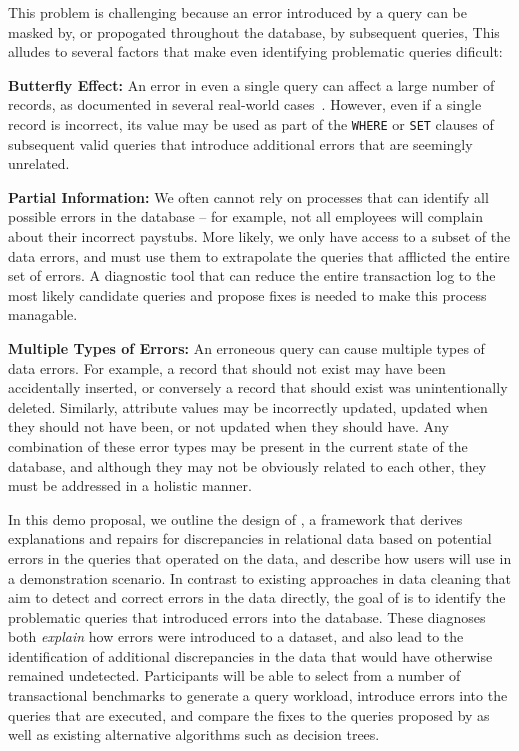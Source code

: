 This problem is challenging because an error introduced by a query can be masked by, or propogated throughout the database,
by subsequent queries, This alludes to several factors that make even identifying problematic queries dificult:

\begin{description}[leftmargin=*, topsep=0mm, itemsep=0mm]

  \item {\bf Butterfly Effect: } 
  An error in even a single query can affect a large number of records, as documented in several real-world
  cases~\cite{Yates10, Grady13, sakalerrors}.  However, even if a single record is incorrect,
  its value may be used as part of the \texttt{WHERE} or \texttt{SET} clauses of 
  subsequent valid queries that introduce additional errors that are seemingly unrelated.

  \item {\bf Partial Information:}  We often cannot rely on processes that can identify all possible
  errors in the database -- for example, not all employees will complain about their incorrect paystubs.  
  More likely, we only have access to a subset of the data errors, and must use them to extrapolate 
  the queries that afflicted the entire set of errors.  A diagnostic tool that can reduce
  the entire transaction log to the most likely candidate queries and propose fixes
  is needed to make this process managable.


  \item {\bf Multiple Types of Errors:} 
  An erroneous query can cause multiple types of data errors.  For example, a record that should not exist may have been accidentally inserted, or conversely a record that 
  should exist was unintentionally deleted.  Similarly, attribute values may be incorrectly updated,
  updated when they should not have been, or not updated when they should have.  
  Any combination of these error types may be present in the current state of the database,
  and although they may not be obviously related to each other, they must be addressed in a holistic manner.  

\end{description}


In this demo proposal, we outline the design of \sys, a framework that derives explanations
and repairs for discrepancies in relational data based on potential errors in
the queries that operated on the data, and describe how users will use \sys
in a demonstration scenario. 
In contrast to existing approaches in data
cleaning that aim to detect and correct errors in the data directly, the goal
of \sys is to identify  the problematic queries that introduced errors into the
database. These diagnoses both \emph{explain} how errors were introduced to a
dataset, and also lead to the identification of additional discrepancies in
the data that would have otherwise remained undetected.
Participants will be able to 
select from a number of transactional benchmarks to generate a query workload,
introduce errors into the queries that are executed,
and compare the fixes to the queries proposed by \sys as well as existing alternative algorithms such as decision trees.



